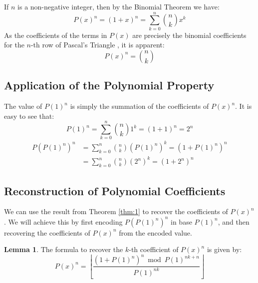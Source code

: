 \documentclass{article}
\theoremstyle{plain}
\theoremstyle{definition}
\newtheorem{lemma}{Lemma}
\begin{document}
If $n$ is a non-negative integer, then by the Binomial Theorem \cite{stewart2007calculus} we have:
\begin{equation}
    P(x)^{n} = (1 + x)^{n} = \sum_{k=0}^{n} \binom{n}{k} x^{k}
\end{equation}
As the coefficients of the terms in $P(x)$ are precisely the binomial coefficients for the $n$-th row of Pascal's Triangle \cite{rosen2011discrete}, it is apparent:
\begin{equation}
    [x^k] P(x)^{n} = \binom{n}{k}
\end{equation}

\subsection{Application of the Polynomial Property}
The value of $P(1)^{n}$ is simply the summation of the coefficients of $P(x)^{n}$. It is easy to see that:
\begin{equation}
    P(1)^{n} = \sum_{k=0}^{n} \binom{n}{k} 1^{k} = (1 + 1)^{n} = 2^{n}
\end{equation}
\begin{align}
    P(P(1)^{n})^{n} &= \sum_{k=0}^{n} \binom{n}{k} (P(1)^{n})^{k} = (1 + P(1)^{n})^{n} \\
    &= \sum_{k=0}^{n} \binom{n}{k} (2^{n})^{k} = (1 + 2^{n})^{n}
\end{align}

\subsection{Reconstruction of Polynomial Coefficients}
We can use the result from Theorem \ref{thm:1} to recover the coefficients of $P(x)^{n}$. We will achieve this by first encoding $P(P(1)^{n})^{n}$ in base $P(1)^{n}$, and then recovering the coefficients of $P(x)^n$ from the encoded value.

\begin{lemma}
    \label{lemma:1}
    The formula to recover the $k$-th coefficient of $P(x)^{n}$ is given by:
    \begin{equation}
        [x^k] P(x)^{n} = \left\lfloor\frac{(1 + P(1)^{n})^{n} \bmod P(1)^{n k + n}}{P(1)^{n k}}\right\rfloor
    \end{equation}
\end{lemma}
\end{document}
